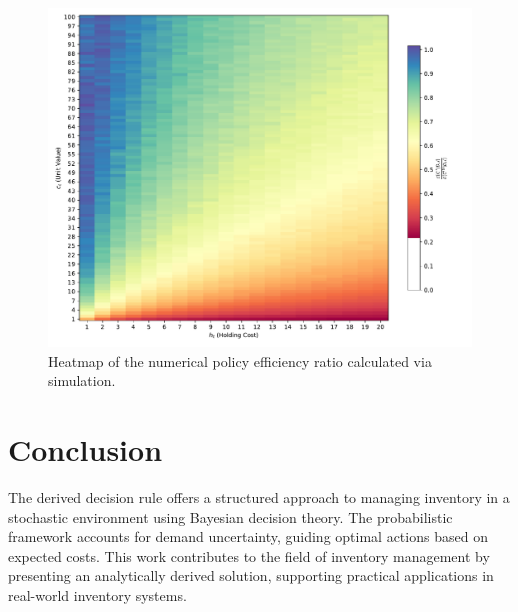 \documentclass[a4paper,12pt]{article}
\begin{document}
	
	\begin{figure}[h!]
		\centering
		\includegraphics[width=\textwidth]{figures/numerical_heatmap.pdf}
		\caption{Heatmap of the numerical policy efficiency ratio calculated via simulation.}
		\label{fig:heatmap_numerical}
	\end{figure}
	


	
	\section{Conclusion}
	The derived decision rule offers a structured approach to managing inventory in a stochastic environment using Bayesian decision theory. The probabilistic framework accounts for demand uncertainty, guiding optimal actions based on expected costs. This work contributes to the field of inventory management by presenting an analytically derived solution, supporting practical applications in real-world inventory systems.
	
\end{document}
